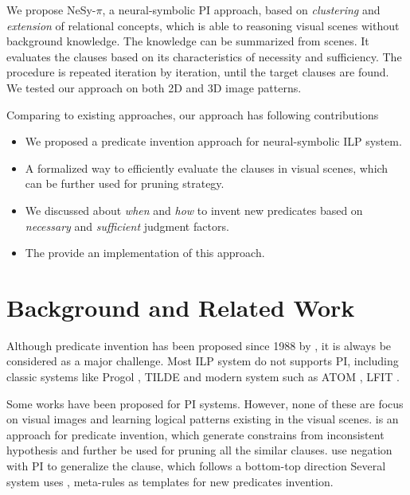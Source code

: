 \documentclass[
]{ceurart}
\begin{document}
We propose NeSy-$\pi$, a neural-symbolic PI approach, based on \textit{clustering} and \textit{extension} of relational concepts, which is able to reasoning visual scenes without background knowledge. The knowledge can be summarized from scenes. It evaluates the clauses based on its characteristics of necessity and sufficiency. The procedure is repeated iteration by iteration, until the target clauses are found. We tested our approach on both 2D and 3D image patterns.

Comparing to existing approaches, our approach has following contributions

\begin{itemize}
	\item We proposed a predicate invention approach for neural-symbolic ILP system.
	\item A formalized way to efficiently evaluate the clauses in visual scenes, which can be further used for pruning strategy.
	\item We discussed about \textit{when} and \textit{how} to invent new predicates based on \textit{necessary} and \textit{sufficient} judgment factors.
	\item The provide an implementation of this approach.
	
\end{itemize}





\section{Background and Related Work}

Although predicate invention has been proposed since 1988 by \cite{MUGGLETON1988339}, it is always be considered as a major challenge. Most ILP system do not supports PI, including classic systems like Progol \cite{Muggleton1995InverseEA}, TILDE\cite{BLOCKEEL1998285} and modern system such as ATOM \cite{atom}, LFIT \cite{LFIT}.

Some works have been proposed for PI systems. However, none of these are focus on visual images and learning logical patterns existing in the visual scenes. 
\cite{pilff} is an approach for predicate invention, which generate constrains from inconsistent hypothesis and further be used for pruning all the similar clauses. \cite{gtnpi} use negation with PI to generalize the clause, which follows a bottom-top direction 
Several system uses \cite{Evans2018}, \cite{kaminski_eiter_inoue_2018} meta-rules as templates for new predicates invention. 
\end{document}
